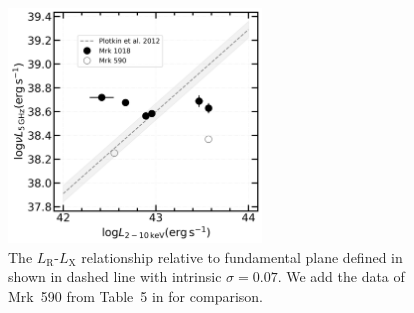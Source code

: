 \documentclass[twocolumn]{aastex63}
\begin{document}
\begin{figure}
\centering
	\includegraphics[width=0.6\textwidth]{./pic/Mrk1018_Mrk590_radio_xray_Plotkin2012_Lx.png}
    \caption{The $L_\mathrm{R}$-$L_\mathrm{X}$ relationship relative to fundamental plane defined in \citet{2012MNRAS.419..267P} shown in dashed line with intrinsic $\sigma=0.07$. We add the data of Mrk~590 from Table~5 in \citet{2016MNRAS.460..304K} for comparison.} 
    \label{fig:radio-xray-mass_relation_Plotkin2012}
\end{figure}



%





\end{document}
